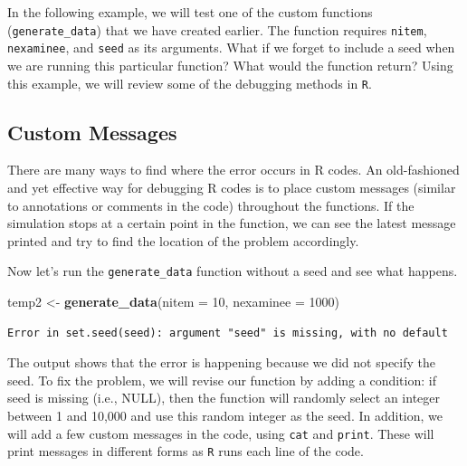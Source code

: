 \documentclass[
]{book}
\newenvironment{Shaded}{\begin{snugshade}}{\end{snugshade}}
\newcommand{\DataTypeTok}[1]{\textcolor[rgb]{0.13,0.29,0.53}{#1}}
\newcommand{\DecValTok}[1]{\textcolor[rgb]{0.00,0.00,0.81}{#1}}
\newcommand{\KeywordTok}[1]{\textcolor[rgb]{0.13,0.29,0.53}{\textbf{#1}}}
\newcommand{\NormalTok}[1]{#1}
\newcommand{\StringTok}[1]{\textcolor[rgb]{0.31,0.60,0.02}{#1}}
\begin{document}
In the following example, we will test one of the custom functions (\texttt{generate\_data}) that we have created earlier. The function requires \texttt{nitem}, \texttt{nexaminee}, and \texttt{seed} as its arguments. What if we forget to include a seed when we are running this particular function? What would the function return? Using this example, we will review some of the debugging methods in \texttt{R}.

\hypertarget{custom-messages}{%
\subsection{Custom Messages}\label{custom-messages}}

There are many ways to find where the error occurs in R codes. An old-fashioned and yet effective way for debugging R codes is to place custom messages (similar to annotations or comments in the code) throughout the functions. If the simulation stops at a certain point in the function, we can see the latest message printed and try to find the location of the problem accordingly.

Now let's run the \texttt{generate\_data} function without a seed and see what happens.

\begin{Shaded}
\begin{Highlighting}[]
\NormalTok{temp2 <-}\StringTok{ }\KeywordTok{generate_data}\NormalTok{(}\DataTypeTok{nitem =} \DecValTok{10}\NormalTok{, }\DataTypeTok{nexaminee =} \DecValTok{1000}\NormalTok{)}
\end{Highlighting}
\end{Shaded}

\begin{verbatim}
Error in set.seed(seed): argument "seed" is missing, with no default
\end{verbatim}

The output shows that the error is happening because we did not specify the seed. To fix the problem, we will revise our function by adding a condition: if seed is missing (i.e., NULL), then the function will randomly select an integer between 1 and 10,000 and use this random integer as the seed. In addition, we will add a few custom messages in the code, using \texttt{cat} and \texttt{print}. These will print messages in different forms as \texttt{R} runs each line of the code.
\end{document}
